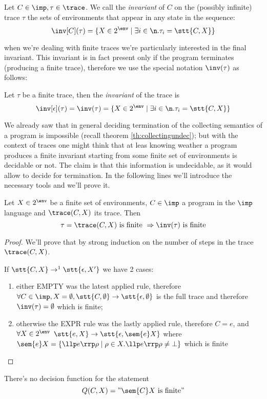 \begin{definition}
  Let \(C \in \imp, \tau \in \trace\). We call the \emph{invariant} of
  \(C\) on the (possibly infinite) trace \(\tau\) the sets of
  environments that appear in any state in the
  sequence: \[\inv[C](\tau) = \{ X \in 2^\env \mid \exists i \in\n
  . \tau_i = \stt{C,X}\}\]
\end{definition}

when we're dealing with finite traces we're particularly interested in
the final invariant. This invariant is in fact present only if the
program terminates (producing a finite trace), therefore we use the
special notation \(\inv(\tau)\) as follows:

\begin{notation}
  Let \(\tau\) be a finite trace, then the \emph{invariant} of the
  trace is \[\inv[\epsilon](\tau) = \inv(\tau) = \{ X \in 2^\env \mid
  \exists i \in\n . \tau_i = \stt{C,X}\}\]
\end{notation}

We already saw that in general deciding termination of the collecting
semantics of a program is impossible (recall theorem
\ref{th:collectingundec}); but with the context of traces one might
think that at leas knowing weather a program produces a finite
invariant starting from some finite set of environments is decidable
or not. The claim is that this information is undecidable, as it would
allow to decide for termination. In the following lines we'll
introduce the necessary tools and we'll prove it.

\begin{theorem}
  Let \(X \in 2^\env\) be a finite set of environments, \(C \in \imp\)
  a program in the \(\imp\) language and \(\trace(C,X)\) its
  trace. Then \[\tau = \trace(C,X) \text{ is finite } \Rightarrow
  \inv(\tau) \text{ is finite}\]
\end{theorem}

\begin{proof}
  We'll prove that by strong induction on the number of steps in the
  trace \(\trace (C,X)\).

  If \(\stt{C,X} \to^1 \stt{\epsilon, X'}\) we have 2 cases:
  \begin{enumerate}
  \item either EMPTY was the latest applied rule, therefore \(\forall
    C \in \imp, X = \emptyset, \stt{C, \emptyset} \to \stt{\epsilon,
      \emptyset}\) is the full trace and therefore \(\inv(\tau) =
    \emptyset\) which is finite;
  \item otherwise the EXPR rule was the lastly applied rule, therefore
    \(C = e\), and \(\forall X \in 2^\env\) \(\stt{e, X} \to
    \stt{\epsilon, \sem{e}X}\) where \(\sem{e}X = \{\llp e \rrp \rho
    \mid \rho \in X . \llp e \rrp \rho \neq \bot\}\) which is finite
  \end{enumerate}
\end{proof}



\begin{theorem}\label{th:finiteness}
  There's no decision function for the statement \[Q(C,X) = "\sem{C} X
  \text{ is finite}"\]
\end{theorem}
